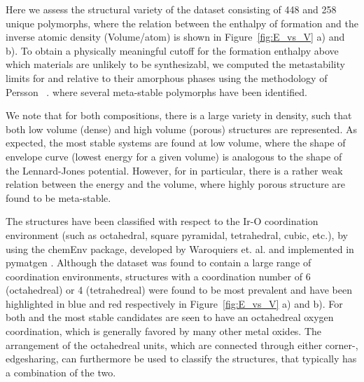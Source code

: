 %
Here we assess the structural variety of the dataset consisting of 448 \IrOtwo and 258 \IrOthree unique polymorphs,
where the relation between the enthalpy of formation and the inverse atomic density (Volume/atom) is shown in Figure~\ref{fig:E_vs_V} a) and b).
%
To obtain a physically meaningful cutoff for the formation enthalpy above which materials are unlikely to be synthesizabl, we computed the metastability limits for \IrOtwo and \IrOthree relative to their amorphous phases using the methodology of Persson ~\cite{Aykol2018}.
where several meta-stable polymorphs have been identified.


We note that for both compositions,
there is a large variety in density,
such that both low volume (dense) and high volume (porous) structures are represented.
%
As expected, the most stable systems are found at low volume,
where the shape of envelope curve (lowest energy for a given volume) is analogous to the shape of the Lennard-Jones potential.
%
However, for \IrOthree in particular,
there is a rather weak relation between the energy and the volume,
where highly porous structure are found to be meta-stable.


%
The structures have been classified with respect to the Ir-O coordination environment
(such as octahedral, square pyramidal, tetrahedral, cubic, etc.),
by using the chemEnv package, developed by Waroquiers et. al. \cite{Waroquiers2017} and implemented in pymatgen \cite{Ong2013}.
%
Although the dataset was found to contain a large range of coordination environments, structures with a coordination number of 6 (octahedreal) or 4 (tetrahedreal) were found to be most prevalent and have been highlighted in blue and red respectively in Figure~\ref{fig:E_vs_V} a) and b).
%
For both \IrOtwo and \IrOthree the most stable candidates are seen to have an octahedreal oxygen coordination, which is generally favored by many other metal oxides. \cite{Waroquiers2017}
%
The arrangement of the octahedreal units, which are connected through either corner-, edgesharing, can furthermore be used to classify the structures, that typically has a combination of the two. 


